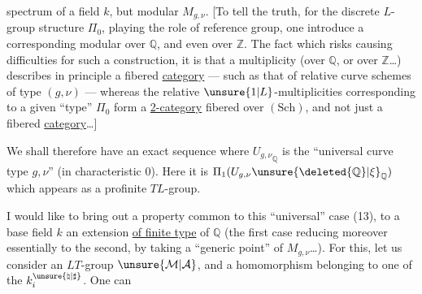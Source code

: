 spectrum of a field $k$, but  modular   $M_{g,\nu}$. [To tell the truth, for the discrete $L$-group structure $\Pi_0$, playing the role of reference group, one   introduce a corresponding modular   over $\mathbb{Q}$, and even over $\mathbb{Z}$. The fact which risks causing  difficulties for such a construction, it is that a  multiplicity (over $\mathbb{Q}$, or over $\mathbb{Z}$\ldots) describes in principle a fibered \uline{category} --- such as that of relative curve schemes of type $(g,\nu)$ --- whereas the relative $\unsure{1|L}$-multiplicities corresponding to a given ``type'' $\Pi_0$ form a \uline{2-category}  fibered over $(\mathrm{Sch})$, and not just a fibered \uline{category}\ldots]


We shall therefore have an exact sequence
where ${U_{g,\nu}}_{\mathbb{Q}}$ is the ``universal curve  type $g,\nu$'' (in characteristic $0$). Here it is $\Pi_1(U_{g,\nu}\unsure{\deleted{\mathbb{Q}}|\xi}_{\mathbb{Q}})$ which appears as a profinite $TL$-group.

I would like to bring out a property common to this ``universal'' case (13),    to a base field $k$ an extension \uline{of finite type} of $\mathbb{Q}$ (the first case reducing moreover essentially to the second, by taking a ``generic point'' of $M_{g,\nu}$\ldots). For this, let us consider an $LT$-group $\unsure{\mathcal{M}|\mathcal{A}}$, and a  homomorphism
belonging to one of the $k_i^{\unsure{\natural|\sharp}}$. One can

